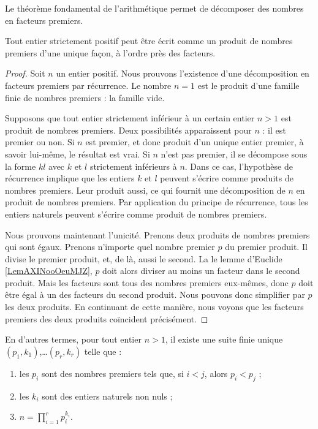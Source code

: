 Le théorème fondamental de l'arithmétique permet de décomposer des nombres en facteurs premiers.

\begin{theorem}        \label{ThoAJFJooAveRvY}
    Tout entier strictement positif peut être écrit comme un produit de nombres premiers d'une unique façon, à l'ordre près des facteurs.
\end{theorem}

\begin{proof}
    
    Soit \( n\) un entier positif. Nous prouvons l'existence d'une décomposition en facteurs premiers par récurrence. Le nombre \( n=1\) est le produit d'une famille finie de nombres premiers : la famille vide.

    Supposons que tout entier strictement inférieur à un certain entier \( n>1\) est produit de nombres premiers. Deux possibilités apparaissent pour $n$ : il est premier ou non. Si $n$ est premier, et donc produit d'un unique entier premier, à savoir lui-même, le résultat est vrai. Si \( n\) n'est pas premier, il se décompose sous la forme $kl$ avec $k$ et $l$ strictement inférieurs à $n$. Dans ce cas, l'hypothèse de récurrence implique que les entiers $k$ et $l$ peuvent s'écrire comme produits de nombres premiers. Leur produit aussi, ce qui fournit une décomposition de $n$ en produit de nombres premiers.  Par application du principe de récurrence, tous les entiers naturels peuvent s'écrire comme produit de nombres premiers.  

    Nous prouvons maintenant l'unicité. Prenons deux produits de nombres premiers qui sont égaux. Prenons n'importe quel nombre premier $p$ du premier produit. Il divise le premier produit, et, de là, aussi le second. La le lemme d'Euclide \ref{LemAXINooOeuMJZ}, $p$ doit alors diviser au moins un facteur dans le second produit. Mais les facteurs sont tous des nombres premiers eux-mêmes, donc $p$ doit être égal à un des facteurs du second produit. Nous pouvons donc simplifier par $p$ les deux produits. En continuant de cette manière, nous voyons que les facteurs premiers des deux produits coïncident précisément.
\end{proof}

En d'autres termes, pour tout entier \( n>1\), il existe une suite finie unique $(p_1, k_1)$,\ldots $(p_r, k_r)$ telle que :
\begin{enumerate}
    \item
les \( p_i\) sont des nombres premiers tels que, si $i < j$, alors $p_i < p_j$ ;
\item
les \( k_i\) sont des entiers naturels non nuls ;
\item
    \( n=\prod_{i=1}^rp_i^{k_i}\).
\end{enumerate}


